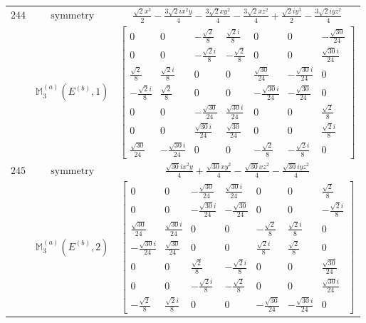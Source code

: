 \documentclass[fleqn,8pt,landscape]{jsarticle}
\begin{document}
\begin{longtable}{ccc}
$ 244 $ & $ \text{symmetry} $ & $ \frac{\sqrt{2} x^{3}}{2} - \frac{3 \sqrt{2} i x^{2} y}{4} - \frac{3 \sqrt{2} x y^{2}}{4} - \frac{3 \sqrt{2} x z^{2}}{4} + \frac{\sqrt{2} i y^{3}}{2} - \frac{3 \sqrt{2} i y z^{2}}{4} $ \\
$  $ & $ \mathbb{M}_{3}^{(a)}(E^{(b)},1) $ & $ \begin{bmatrix} 0 & 0 & - \frac{\sqrt{2}}{8} & \frac{\sqrt{2} i}{8} & 0 & 0 & - \frac{\sqrt{30}}{24} \\ 0 & 0 & - \frac{\sqrt{2} i}{8} & - \frac{\sqrt{2}}{8} & 0 & 0 & \frac{\sqrt{30} i}{24} \\ \frac{\sqrt{2}}{8} & \frac{\sqrt{2} i}{8} & 0 & 0 & \frac{\sqrt{30}}{24} & - \frac{\sqrt{30} i}{24} & 0 \\ - \frac{\sqrt{2} i}{8} & \frac{\sqrt{2}}{8} & 0 & 0 & - \frac{\sqrt{30} i}{24} & - \frac{\sqrt{30}}{24} & 0 \\ 0 & 0 & - \frac{\sqrt{30}}{24} & \frac{\sqrt{30} i}{24} & 0 & 0 & \frac{\sqrt{2}}{8} \\ 0 & 0 & \frac{\sqrt{30} i}{24} & \frac{\sqrt{30}}{24} & 0 & 0 & \frac{\sqrt{2} i}{8} \\ \frac{\sqrt{30}}{24} & - \frac{\sqrt{30} i}{24} & 0 & 0 & - \frac{\sqrt{2}}{8} & - \frac{\sqrt{2} i}{8} & 0 \end{bmatrix} $ \\ \hline
$ 245 $ & $ \text{symmetry} $ & $ \frac{\sqrt{30} i x^{2} y}{4} + \frac{\sqrt{30} x y^{2}}{4} - \frac{\sqrt{30} x z^{2}}{4} - \frac{\sqrt{30} i y z^{2}}{4} $ \\
$  $ & $ \mathbb{M}_{3}^{(a)}(E^{(b)},2) $ & $ \begin{bmatrix} 0 & 0 & - \frac{\sqrt{30}}{24} & \frac{\sqrt{30} i}{24} & 0 & 0 & \frac{\sqrt{2}}{8} \\ 0 & 0 & - \frac{\sqrt{30} i}{24} & - \frac{\sqrt{30}}{24} & 0 & 0 & - \frac{\sqrt{2} i}{8} \\ \frac{\sqrt{30}}{24} & \frac{\sqrt{30} i}{24} & 0 & 0 & - \frac{\sqrt{2}}{8} & \frac{\sqrt{2} i}{8} & 0 \\ - \frac{\sqrt{30} i}{24} & \frac{\sqrt{30}}{24} & 0 & 0 & \frac{\sqrt{2} i}{8} & \frac{\sqrt{2}}{8} & 0 \\ 0 & 0 & \frac{\sqrt{2}}{8} & - \frac{\sqrt{2} i}{8} & 0 & 0 & \frac{\sqrt{30}}{24} \\ 0 & 0 & - \frac{\sqrt{2} i}{8} & - \frac{\sqrt{2}}{8} & 0 & 0 & \frac{\sqrt{30} i}{24} \\ - \frac{\sqrt{2}}{8} & \frac{\sqrt{2} i}{8} & 0 & 0 & - \frac{\sqrt{30}}{24} & - \frac{\sqrt{30} i}{24} & 0 \end{bmatrix} $ \\ \hline

\end{longtable}
\end{document}
